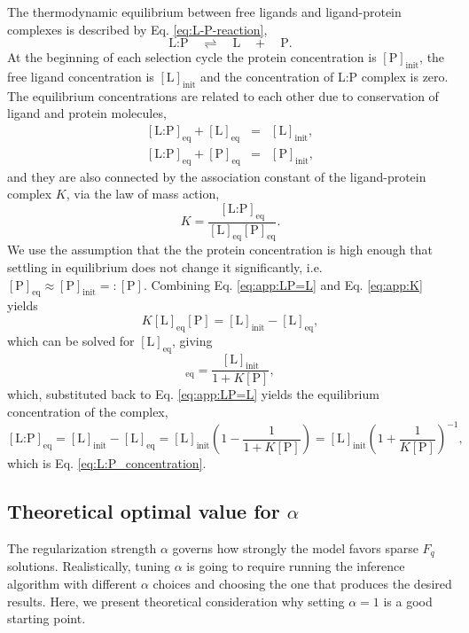 \documentclass[letter,10pt,oneside]{article}
\newcommand{\bel}{\begin{equation}}
\newcommand{\eel}{\end{equation}}
\newcommand{\be}{\begin{equation*}}
\newcommand{\ee}{\end{equation*}}
\newcommand{\bal}{\begin{eqnarray}}
\newcommand{\eal}{\end{eqnarray}}
\newcommand{\+}{^\dagger}
\newcommand{\refeq}[1]{Eq. \ref{#1}}
\begin{document}
\begin{appendix}
The thermodynamic equilibrium between free ligands and ligand-protein complexes is described by \refeq{eq:L-P-reaction},
\be
  \text{L:P} \quad \rightleftharpoons\quad  \text{L} \quad +\quad  \text{P}.
\ee
At the beginning of each selection cycle the protein concentration is $[\text{P}]_\text{init}$, the free ligand concentration is $[\text{L}]_\text{init}$ and the concentration of L:P complex is zero. The equilibrium concentrations are related to each other due to conservation of ligand and protein molecules,
\bal
\label{eq:app:LP=L}
  {}[\text{L:P}]_\text{eq} + [\text{L}]_\text{eq} &=& [\text{L}]_\text{init}, \\
  {}[\text{L:P}]_\text{eq} + [\text{P}]_\text{eq} &=& [\text{P}]_\text{init},
\eal
and they are also connected by the association constant of the ligand-protein complex $K$, via the law of mass action,
\bel
\label{eq:app:K}
  K = \frac{[\text{L:P}]_\text{eq}}{[\text{L}]_\text{eq}[\text{P}]_\text{eq}}.
\eel
We use the assumption that the the protein concentration is high enough that settling in equilibrium does not change it significantly, i.e. $[\text{P}]_\text{eq} \approx [\text{P}]_\text{init} =: [\text{P}]$. Combining \refeq{eq:app:LP=L} and \refeq{eq:app:K} yields
\be
  K [\text{L}]_\text{eq}[\text{P}] = [\text{L}]_\text{init} - [\text{L}]_\text{eq},
\ee
which can be solved for $[\text{L}]_\text{eq}$, giving
\be
  [\text{L}]_\text{eq} = \frac{[\text{L}]_\text{init}}{1 + K[\text{P}]},
\ee
which, substituted back to \refeq{eq:app:LP=L} yields the equilibrium concentration of the complex,
\be
  {}[\text{L:P}]_\text{eq} = [\text{L}]_\text{init} - [\text{L}]_\text{eq} = [\text{L}]_\text{init}\left(1 - \frac{1}{1 + K[\text{P}]}\right) = [\text{L}]_\text{init} \left(1 + \frac{1}{K[\text{P}]}\right)^{-1},
\ee
which is \refeq{eq:L:P_concentration}.

\subsection{Theoretical optimal value for $\alpha$}
\label{app:best_alpha}
The regularization strength $\alpha$ governs how strongly the model favors sparse $F_q$ solutions. Realistically, tuning $\alpha$ is going to require  running the inference algorithm with different $\alpha$ choices and choosing the one that produces the desired results. Here, we present theoretical consideration why setting $\alpha = 1$ is a good starting point.


\end{appendix}
\end{document}
